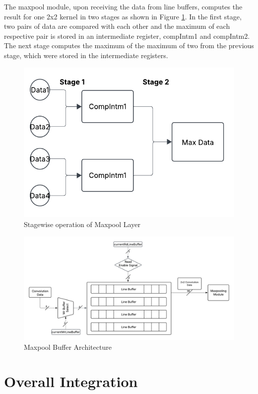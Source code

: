     \noindent The maxpool module, upon receiving the data from line buffers, computes the result for one 2x2 kernel in two stages as shown in Figure \ref{fig:stagewise_conv}. In the first stage, two pairs of data are compared with each other and the maximum of each respective pair is stored in an intermediate register, compIntm1 and compIntm2. The next stage computes the maximum of the maximum of two from the previous stage, which were stored in the intermediate registers.

    \begin{figure}[h!]
        \centering
        \includegraphics[width=0.75\linewidth]{images/stageWiseMax.png}
        \caption{Stagewise operation of Maxpool Layer}
        \label{fig:stagewise_conv}
    \end{figure}

    \begin{figure}[H]
        \centering
        \includegraphics[width=\linewidth]{images/maxpool_architecture.png}
        \caption{Maxpool Buffer Architecture}
        \label{fig:max_buff_arch}
    \end{figure}
    
    \section{Overall Integration}
